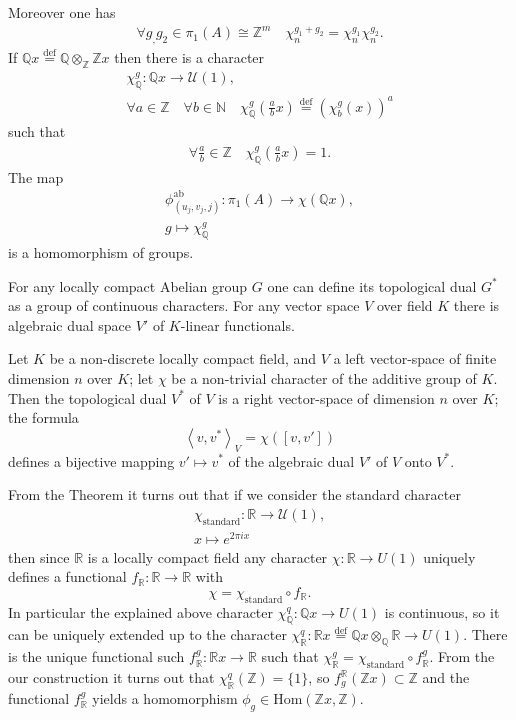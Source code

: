 \documentclass{beamer}
\theoremstyle{plain}
\newcommand{\Z}{\mathbb{Z}}                  %
\newcommand{\Q}{\mathbb{Q}}                  %
\newcommand{\R}{\mathbb{R}}                  %
\newcommand{\Hom}{\mathrm{Hom}}
\newcommand{\sU}{\mathcal{U}}       %
\newcommand{\N}{\mathbb{N}}                  %
\newcommand{\bean}{\begin{eqnarray*}}
\newcommand{\eean}{\end{eqnarray*}}
\newcommand{\bydef}{\stackrel{\mathrm{def}}{=}}
\begin{document}
\begin{frame}
Moreover one has
\bean
\forall g_, g_2\in \pi_1\left( A\right)\cong \Z^m\quad \chi^{g_1 + g_2}_n =  \chi^{g_1}_n \chi^{g_2}_n. 
\eean
If $\Q x \bydef \Q \otimes_\Z \Z  x$ then there is a character
\bean
\chi^g_\Q:  \Q x \to \sU\left( 1\right),\\
\forall a \in \Z \quad \forall b \in \N \quad \chi^g_\Q\left(\frac{a}{b} x\right)\bydef \left( \chi^g_b\left( x\right)\right)^a
\eean
such that
\bean
\forall  \frac{a}{b} \in \Z\quad \chi^g_\Q\left( \frac{a}{b} x\right) = 1.
\eean
The map
\bean
\phi^{\mathrm{ab}}_{\left( u_j, v_j, j\right)}: \pi_1\left(A\right)\to \chi\left(\Q x \right),\\
g \mapsto  \chi^g_\Q
\eean
is a homomorphism of groups. 
\end{frame}
\begin{frame}
 For any locally compact Abelian group $G$   one can define its \alert{topological dual} $G^*$ as a group of continuous  characters. For any vector space $V$ over field $K$ there is \alert{algebraic dual} space $V'$ of $K$-linear functionals.
\begin{theorem}
	Let $K$ be a non-discrete locally compact field, and $V$
	a left vector-space of finite dimension $n$ over $K$; let $\chi$ be a non-trivial
	character of the additive group of $K$. Then the topological dual $V^*$ of $V$ is
	a right vector-space of dimension $n$ over $K$; the formula
	$$
	\left\langle v, v^* \right\rangle_V =  \chi\left(\left[v, v'\right] \right) 
	$$
	defines a bijective mapping $v' \mapsto v^*$ of the algebraic dual $V'$ of $V$ onto $V^*$.
\end{theorem}

\end{frame}
\begin{frame}
	From the Theorem it turns out that if we consider the  {standard character}
	\bean
	\chi_{\text{standard}}: \R \to \sU\left(1 \right) ,\\
	x \mapsto e^{2\pi i x}
	\eean
	then since $\R$ is a locally compact field any character $\chi : \R \to U\left( 1\right)$ uniquely defines a functional $f_\R : \R \to \R$ with
	$$
	\chi = \chi_{\text{standard}} \circ f_\R.
	$$ 
In particular the explained above character $\chi^q_\Q: \Q x \to U(1)$ is continuous, so it can be uniquely extended up to the character $\chi^q_\R: \R x\bydef \Q x \otimes_\Q \R \to U(1)$.	
There is the unique  functional such 
	$f^g_\R : \R x \to \R$ such that $\chi^g_\R = \chi_{\text{standard}}\circ f^g_\R$. From the our construction   it turns out that $\chi^q_\R\left( \Z\right)= \{1\} $, so $f^\R_g\left( \Z  x \right) \subset \Z$ and the functional $f_\R^g$ yields a homomorphism $\phi_g \in \Hom \left( \Z  x , \Z\right)$.
	

\end{frame}
\end{document}
